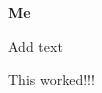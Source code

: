 \documentclass{scrbook}
\begin{document}
\begin{titlepage}
\textbf{\Huge Me}
\end{titlepage}

Add text

This worked!!!
\end{document}
